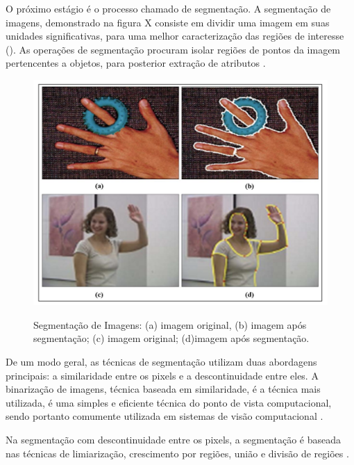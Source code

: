 O próximo estágio é o processo chamado de segmentação. A segmentação de imagens, demonstrado na figura X consiste em dividir uma imagem em suas unidades significativas, para uma melhor caracterização das regiões de interesse (). As operações de segmentação procuram isolar regiões de pontos da imagem pertencentes a objetos, para posterior extração de atributos \cite{Lourdes2010}.
 \begin{figure}[h]
	\centering
	\includegraphics[width=1.0\textwidth]{Imagens/segmentacao} %
	\caption[Segmentação de Imagens: (a) imagem original, (b) imagem após segmentação; (c) imagem original; (d)imagem após segmentação.]{Segmentação de Imagens: (a) imagem original, (b) imagem após segmentação; (c) imagem original; (d)imagem após segmentação.}
	\label{fig:tux_laplace}
\end{figure}
De um modo geral, as técnicas de segmentação utilizam duas abordagens principais: a similaridade entre os pixels e a descontinuidade entre eles. A binarização de imagens, técnica baseada em similaridade, é a técnica mais utilizada, é uma  simples e eficiente técnica do ponto de vista computacional, sendo portanto comumente utilizada em sistemas de visão computacional \cite{ISRAEL2003}.

Na segmentação com descontinuidade entre os pixels, a segmentação é baseada nas técnicas de limiarização, crescimento por regiões, união e divisão de regiões \cite{Rodrigues2002}.  %

